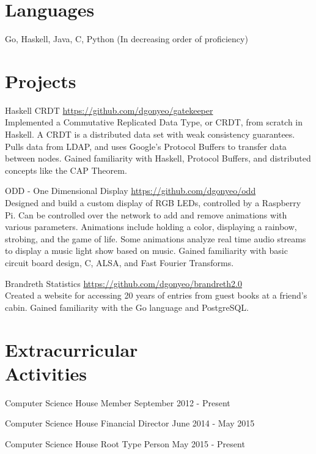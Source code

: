 \documentclass[letterpaper,margin,line,11pt]{resume}
\newcommand{\rurl}[1]{\hfill {\footnotesize \url{#1}}}
\begin{document}
\begin{resume}
\section{\mysidestyle Languages}
    Go, Haskell, Java, C, Python
    \hfill 
    \footnotesize 
    (In decreasing order of proficiency)
    \normalsize

\section{\mysidestyle Projects}
    \begin{compactdesc}
        \item[Haskell CRDT] \rurl{https://github.com/dgonyeo/gatekeeper} \\
            Implemented a Commutative Replicated Data Type, or CRDT, from scratch in Haskell. A CRDT is a distributed data set with weak consistency guarantees. Pulls data from LDAP, and uses Google's Protocol Buffers to transfer data between nodes. Gained familiarity with Haskell, Protocol Buffers, and distributed concepts like the CAP Theorem. \\
        \item[ODD - One Dimensional Display] \rurl{https://github.com/dgonyeo/odd} \\
            Designed and build a custom display of RGB LEDs, controlled by a Raspberry Pi. Can be controlled over the network to add and remove animations with various parameters. Animations include holding a color, displaying a rainbow, strobing, and the game of life. Some animations analyze real time audio streams to display a music light show based on music. Gained familiarity with basic circuit board design, C, ALSA, and Fast Fourier Transforms. \\
        \item[Brandreth Statistics] \rurl{https://github.com/dgonyeo/brandreth2.0} \\
            Created a website for accessing 20 years of entries from guest books at a friend's cabin. Gained familiarity with the Go language and PostgreSQL.
    \end{compactdesc}

\section{\mysidestyle Extracurricular \\ Activities}
    \begin{asparablank}
        \item Computer Science House Member \hfill September 2012 - Present
        \item Computer Science House Financial Director \hfill June 2014 - May 2015
        \item Computer Science House Root Type Person \hfill May 2015 - Present
    \end{asparablank}

\end{resume}
\end{document}
